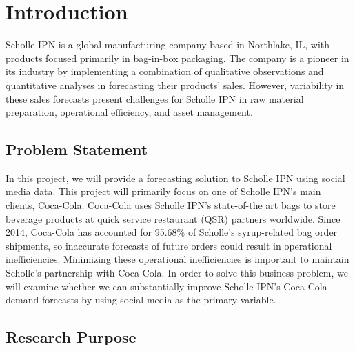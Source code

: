 \documentclass[12pt,oneside]{chicagocapstone}
\begin{document}
  \listoffigures

  \listoftables


\mainmatter %
\pagestyle{fancyplain} %

\chapter*{Introduction}\label{introduction}

Scholle IPN is a global manufacturing company based in Northlake, IL,
with products focused primarily in bag-in-box packaging. The company is
a pioneer in its industry by implementing a combination of qualitative
observations and quantitative analyses in forecasting their products'
sales. However, variability in these sales forecasts present challenges
for Scholle IPN in raw material preparation, operational efficiency, and
asset management.

\section*{Problem Statement}\label{problem-statement}

In this project, we will provide a forecasting solution to Scholle IPN
using social media data. This project will primarily focus on one of
Scholle IPN's main clients, Coca-Cola. Coca-Cola uses Scholle IPN's
state-of-the art bags to store beverage products at quick service
restaurant (QSR) partners worldwide. Since 2014, Coca-Cola has accounted
for 95.68\% of Scholle's syrup-related bag order shipments, so
inaccurate forecasts of future orders could result in operational
inefficiencies. Minimizing these operational inefficiencies is important
to maintain Scholle's partnership with Coca-Cola. In order to solve this
business problem, we will examine whether we can substantially improve
Scholle IPN's Coca-Cola demand forecasts by using social media as the
primary variable.

\section*{Research Purpose}\label{research-purpose}
\end{document}
